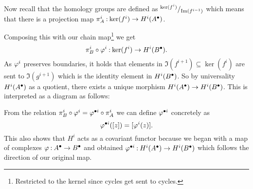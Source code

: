 \documentclass[12pt]{memoir}
\begin{document}
\begin{ptcbr}
\begin{itemize}
\begin{center}
        \end{center}
    \end{itemize}
Now recall that the homology groups are defined as $\quot{\ker(f^i)}{\Im(f^{i-1})}$ which means that there is a projection map $\pi^i_{A}\mathbin{:} \ker(f^i)\to H^i(A^\bullet)$.\par 
Composing this with our chain map\footnote{Restricted to the kernel since cycles get sent to cycles.} we get 
$$\pi^i_{B}\circ\varphi^i\mathbin{:}\ker(f^i)\to H^i(B^\bullet).$$
As $\varphi^i$ preserves boundaries, it holds that elements in $\Im(f^{i+1})\subseteq\ker(f^i)$ are sent to $\Im(g^{i+1})$ which is the identity element in $H^i(B^\bullet)$. So by universality $H^i(A^\bullet)$ as a quotient, there exists a unique morphism $H^i(A^\bullet)\to H^i(B^\bullet)$. This is interpreted as a diagram as follows:
\begin{center}
\end{center}
    From the relation $\pi^i_B\circ\varphi^i=\varphi^{\bullet i}\circ\pi^i_A$ we can define $\varphi^{\bullet i}$ concretely as 
    $$\varphi^{\bullet i}([z])=[\varphi^i(z)].$$ 
    This also shows that $H^i$ acts as a covariant functor because we began with a map of complexes $\varphi\mathbin{:}A^{\bullet}\to B^{\bullet}$ and obtained $\varphi^{\bullet i}\mathbin{:} H^i(A^\bullet)\to H^i(B^\bullet)$ which follows the direction of our original map. 
    \end{ptcbr}
\end{document}
